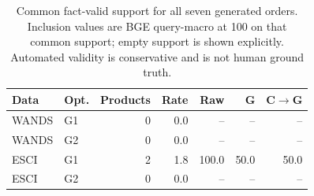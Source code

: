 \begin{table}[t]\caption{Common fact-valid support for all seven generated orders. Inclusion values are BGE query-macro at 100 on that common support; empty support is shown explicitly. Automated validity is conservative and is not human ground truth.}\label{tab:optvalid}\centering\scriptsize
\begin{tabular}{llrrrrr}\toprule Data&Opt.&Products&Rate&Raw&G&C$\to$G\\\midrule
WANDS & G1 & 0 & 0.0 & -- & -- & --\\
WANDS & G2 & 0 & 0.0 & -- & -- & --\\
ESCI & G1 & 2 & 1.8 & 100.0 & 50.0 & 50.0\\
ESCI & G2 & 0 & 0.0 & -- & -- & --\\
\bottomrule\end{tabular}\end{table}
